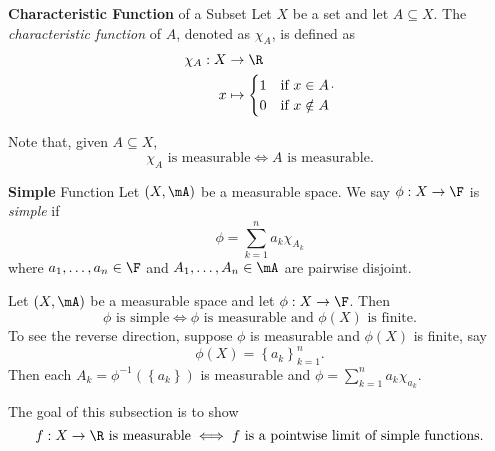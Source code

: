 \documentclass[pmath451]{subfiles}
\begin{document}
    \begin{definition}{\textbf{Characteristic Function} of a Subset}
        Let $X$ be a set and let $A\subseteq X$. The \emph{characteristic function} of $A$, denoted as $\chi_A$, is defined as
        \begin{equation*}
            \begin{aligned}
                \chi_A:X&\to \R \\
                x&\mapsto
                \begin{cases} 1 & \text{if $x\in A$} \\ 0 & \text{if $x\notin A$} \end{cases}
            \end{aligned} .
        \end{equation*}
    \end{definition}
    
    \np Note that, given $A\subseteq X$,
    \begin{equation*}
        \text{$\chi_A$ is measurable} \iff \text{$A$ is measurable}.
    \end{equation*}
    
    \begin{definition}{\textbf{Simple} Function}
        Let $\left( X,\mA \right)$ be a measurable space. We say $\phi:X\to\F$ is \emph{simple} if
        \begin{equation*}
            \phi = \sum^{n}_{k=1} a_k\chi_{A_k}
        \end{equation*}
        where $a_1,\ldots,a_n\in\F$ and $A_1,\ldots,A_n\in\mA$ are pairwise disjoint.
    \end{definition}
    
    \np Let $\left( X,\mA \right)$ be a measurable space and let $\phi:X\to\F$. Then
    \begin{equation*}
        \text{$\phi$ is simple} \iff \text{$\phi$ is measurable and $\phi\left( X \right)$ is finite}.
    \end{equation*}
    To see the reverse direction, suppose $\phi$ is measurable and $\phi\left( X \right)$ is finite, say
    \begin{equation*}
        \phi\left( X \right) = \left\lbrace a_k \right\rbrace^{n}_{k=1}.
    \end{equation*}
    Then each $A_k = \phi^{-1}\left( \left\lbrace a_k \right\rbrace \right)$ is measurable and $\phi = \sum^{n}_{k=1} a_k\chi_{a_k}$.
    
    \np The goal of this subsection is to show
    \begin{equation*}
        \text{$f:X\to\R$ is measurable} \iff \text{$f$ is a pointwise limit of simple functions}.
    \end{equation*}
    
\end{document}
